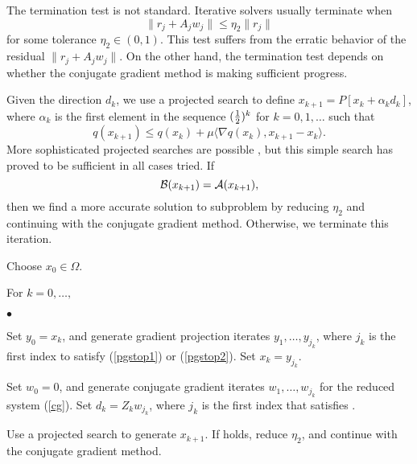 The termination test  is not standard.
Iterative solvers usually terminate when
\[
\| r_j + A_j w_j \| \le \eta_2 \|r_j\| 
\]
for some tolerance $\eta_2 \in (0,1) $.
This test suffers from the erratic behavior
of the residual $ \| r_j + A_j w_j \| $.
On the other hand, the termination test 
depends on  whether the conjugate gradient method
is making sufficient progress.

Given the direction $ d_k $, we use a projected
search \cite{more-toraldo} to define 
$ x_{k+1} = P [ x_k + \alpha_k d_k] $, where
$ \alpha_k $ is the first element in
the sequence $ ( \frac{1}{2} ) ^ k $ for $ k = 0, 1, \ldots $ such that
\begin{equation}  \label{cglsstop2}
 q( x_{k+1} ) \le  q(x_k) + \mu
\langle \nabla q(x_k), x_{k+1} - x_k \rangle .
\end{equation}
More sophisticated projected searches are possible \cite{more-toraldo}
,
but this simple search has proved to be sufficient in all cases tried.
If
\begin{equation}
\label{cgstop3}
\cB ( x_{k+1} ) = \cA ( x_{k+1} ) ,
\end{equation}
then we find a more
accurate solution to subproblem  by reducing $ \eta_2 $
and continuing with the conjugate gradient method.
Otherwise, we terminate this iteration.

\begin{Algorithm}
\begin{list}{}
{
\setlength{\parsep}{0pt}
\setlength{\itemsep}{0pt}
\setlength{\topsep}{0pt}
}
\item[]
Choose $ x_0 \in \Omega $.
\item[]
For $ k = 0, \ldots, $
\begin{list}{$\bullet$}
{
}
\item[]
Set $y_0 = x_k$, and generate gradient projection iterates
$y_1, \ldots, y_{j_k}$, where $j_k$ is the first index to satisfy
(\ref{pgstop1}) or (\ref{pgstop2}). 
Set $x_k= y_{j_k}$.

\item[]
Set $ w_0 = 0 $, and
generate conjugate gradient iterates $ w_1 , \ldots, w_{j_k} $
for the reduced system (\ref{cg}).
Set $ d _ k = Z_k w _ {j_k} $, where $j_k$ is the first index
that satisfies .
\item[]
Use a projected search to generate $ x_{k+1} $.
If  holds, reduce $\eta_2$, and
continue with the conjugate gradient method.
\end{list}
\end{list}
\end{Algorithm}

